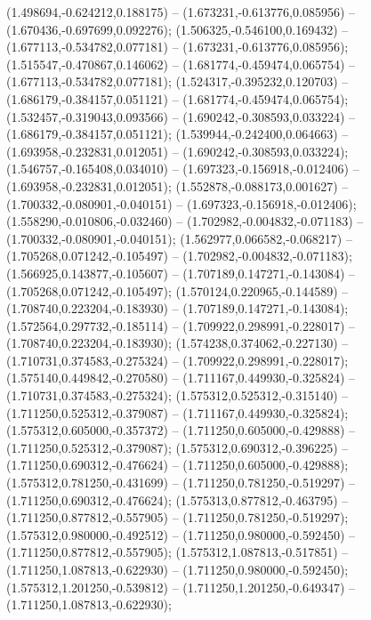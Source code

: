  (1.498694,-0.624212,0.188175) -- (1.673231,-0.613776,0.085956) -- (1.670436,-0.697699,0.092276);
 (1.506325,-0.546100,0.169432) -- (1.677113,-0.534782,0.077181) -- (1.673231,-0.613776,0.085956);
 (1.515547,-0.470867,0.146062) -- (1.681774,-0.459474,0.065754) -- (1.677113,-0.534782,0.077181);
 (1.524317,-0.395232,0.120703) -- (1.686179,-0.384157,0.051121) -- (1.681774,-0.459474,0.065754);
 (1.532457,-0.319043,0.093566) -- (1.690242,-0.308593,0.033224) -- (1.686179,-0.384157,0.051121);
 (1.539944,-0.242400,0.064663) -- (1.693958,-0.232831,0.012051) -- (1.690242,-0.308593,0.033224);
 (1.546757,-0.165408,0.034010) -- (1.697323,-0.156918,-0.012406) -- (1.693958,-0.232831,0.012051);
 (1.552878,-0.088173,0.001627) -- (1.700332,-0.080901,-0.040151) -- (1.697323,-0.156918,-0.012406);
 (1.558290,-0.010806,-0.032460) -- (1.702982,-0.004832,-0.071183) -- (1.700332,-0.080901,-0.040151);
 (1.562977,0.066582,-0.068217) -- (1.705268,0.071242,-0.105497) -- (1.702982,-0.004832,-0.071183);
 (1.566925,0.143877,-0.105607) -- (1.707189,0.147271,-0.143084) -- (1.705268,0.071242,-0.105497);
 (1.570124,0.220965,-0.144589) -- (1.708740,0.223204,-0.183930) -- (1.707189,0.147271,-0.143084);
 (1.572564,0.297732,-0.185114) -- (1.709922,0.298991,-0.228017) -- (1.708740,0.223204,-0.183930);
 (1.574238,0.374062,-0.227130) -- (1.710731,0.374583,-0.275324) -- (1.709922,0.298991,-0.228017);
 (1.575140,0.449842,-0.270580) -- (1.711167,0.449930,-0.325824) -- (1.710731,0.374583,-0.275324);
 (1.575312,0.525312,-0.315140) -- (1.711250,0.525312,-0.379087) -- (1.711167,0.449930,-0.325824);
 (1.575312,0.605000,-0.357372) -- (1.711250,0.605000,-0.429888) -- (1.711250,0.525312,-0.379087);
 (1.575312,0.690312,-0.396225) -- (1.711250,0.690312,-0.476624) -- (1.711250,0.605000,-0.429888);
 (1.575312,0.781250,-0.431699) -- (1.711250,0.781250,-0.519297) -- (1.711250,0.690312,-0.476624);
 (1.575313,0.877812,-0.463795) -- (1.711250,0.877812,-0.557905) -- (1.711250,0.781250,-0.519297);
 (1.575312,0.980000,-0.492512) -- (1.711250,0.980000,-0.592450) -- (1.711250,0.877812,-0.557905);
 (1.575312,1.087813,-0.517851) -- (1.711250,1.087813,-0.622930) -- (1.711250,0.980000,-0.592450);
 (1.575312,1.201250,-0.539812) -- (1.711250,1.201250,-0.649347) -- (1.711250,1.087813,-0.622930);
